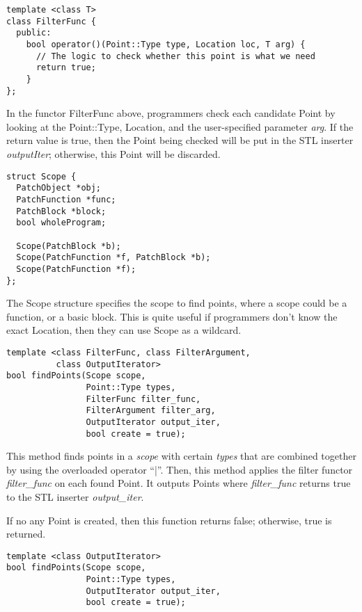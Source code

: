 \begin{verbatim}
template <class T>
class FilterFunc {
  public:
    bool operator()(Point::Type type, Location loc, T arg) {
      // The logic to check whether this point is what we need
      return true;
    }
};

\end{verbatim}



In the functor FilterFunc above, programmers check each candidate Point by
looking at the Point::Type, Location, and the user-specified parameter \emph{arg}.
If the return value is true, then the Point being checked will be put in the STL
inserter \emph{outputIter}; otherwise, this Point will be discarded.


\begin{verbatim}
struct Scope {
  PatchObject *obj;
  PatchFunction *func;
  PatchBlock *block;
  bool wholeProgram;

  Scope(PatchBlock *b);
  Scope(PatchFunction *f, PatchBlock *b);
  Scope(PatchFunction *f);
};

\end{verbatim}



The Scope structure specifies the scope to find points, where a scope could be
a function, or a basic block. This is quite useful if programmers don't know the
exact Location, then they can use Scope as a wildcard.


\begin{verbatim}
template <class FilterFunc, class FilterArgument,
          class OutputIterator>
bool findPoints(Scope scope,
                Point::Type types,
                FilterFunc filter_func,
                FilterArgument filter_arg,
                OutputIterator output_iter,
                bool create = true);

\end{verbatim}



This method finds points in a \emph{scope} with certain \emph{types} that are combined
together by using the overloaded operator ``|''. Then, this method applies the
filter functor \emph{filter\_func} on each found Point. It outputs Points where
\emph{filter\_func} returns true to the STL inserter \emph{output\_iter}.

If no any Point is created, then this function returns false; otherwise, true is
returned.



\begin{verbatim}
template <class OutputIterator>
bool findPoints(Scope scope,
                Point::Type types,
                OutputIterator output_iter,
                bool create = true);

\end{verbatim}



